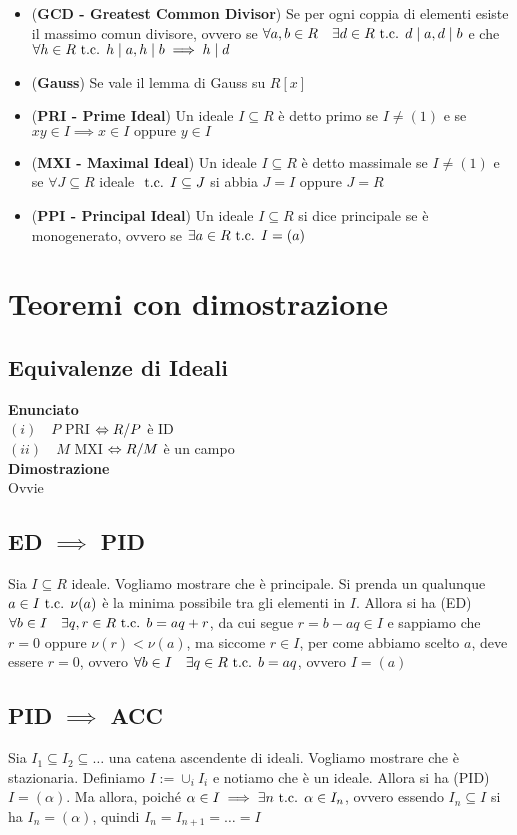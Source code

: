 \documentclass[a4paper,GeneralMath,NoNotes]{stdmdoc}
\newcommand{\opp}{\text{ oppure }}
\newcommand{\Enunciato}{\vskip 0.05cm \noindent \textbf{Enunciato} \\ }
\renewcommand{\Dimostrazione}{\vskip 0.05cm \noindent \textbf{Dimostrazione} \\ }
\begin{document}
\begin{itemize}
		\item ({\bf GCD - Greatest Common Divisor}) Se per ogni coppia di elementi esiste il massimo comun divisore, ovvero se $\forall a, b \in R \quad \exists d \in R \mbox{ t.c. } d \mid a, d \mid b$ e che $\forall h \in R \mbox{ t.c. } h \mid a, h \mid b \implies h \mid d$
		\item ({\bf Gauss}) Se vale il lemma di Gauss su $R[x]$
		\item ({\bf PRI - Prime Ideal}) Un ideale $I \subseteq R$ è detto primo se $I \neq (1)$ e se $xy \in I \implies x \in I \opp y \in I$
		\item ({\bf MXI - Maximal Ideal}) Un ideale $I \subseteq R$ è detto massimale se $I \neq (1)$ e se $\forall J \subseteq R$ ideale $\mbox{ t.c. } I \subseteq J$ si abbia $J = I \opp J = R$
		\item ({\bf PPI - Principal Ideal}) Un ideale $I \subseteq R$ si dice principale se è monogenerato, ovvero se $\exists a \in R \mbox{ t.c. } I = (a)$
	\end{itemize}

	\section*{Teoremi con dimostrazione}
	\subsection{Equivalenze di Ideali}
	\Enunciato
		$(i) \quad P $ PRI $\Leftrightarrow R/P$ è ID \\
		$(ii) \quad M $ MXI $\Leftrightarrow R/M$ è un campo \\
	\Dimostrazione Ovvie

	\subsection{ED $\implies$ PID}
	Sia $I \subseteq R$ ideale. Vogliamo mostrare che è principale. Si prenda un qualunque $a \in I \mbox{ t.c. } \nu(a)$ è la minima possibile tra gli elementi in $I$. Allora si ha (ED) $\forall b \in I \quad \exists q,r \in R \mbox{ t.c. } b = aq + r$, da cui segue $r = b - aq \in I$ e sappiamo che $r = 0 \opp \nu(r) < \nu(a)$, ma siccome $r \in I$, per come abbiamo scelto $a$, deve essere $r = 0$, ovvero $\forall b \in I \quad \exists q \in R \mbox{ t.c. } b = aq$, ovvero $I = (a)$
	
	\subsection{PID $\implies$ ACC}
	Sia $I_1 \subseteq I_2 \subseteq \ldots$ una catena ascendente di ideali. Vogliamo mostrare che è stazionaria. Definiamo $I := \cup_{i} I_i$ e notiamo che è un ideale. Allora si ha (PID) $I = (\alpha)$. Ma allora, poiché $\alpha \in I \implies \exists n \mbox{ t.c. } \alpha \in I_n$, ovvero essendo $I_n \subseteq I$ si ha $I_n = (\alpha)$, quindi $I_n = I_{n+1} = \ldots = I$
\end{document}
